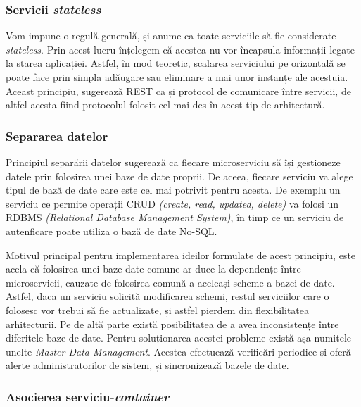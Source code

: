 \subsubsection{Servicii \textit{stateless}}

Vom impune o regulă generală, și anume ca toate serviciile să fie considerate \textit{stateless}. Prin acest lucru înțelegem că acestea nu vor încapsula informații legate la starea aplicației. Astfel, în mod teoretic, scalarea serviciului pe orizontală se poate face prin simpla adăugare sau eliminare a mai unor instanțe ale acestuia. Aceast principiu, sugerează REST ca și protocol de comunicare între servicii, de altfel acesta fiind protocolul folosit cel mai des în acest tip de arhitectură\cite{buildingmicro}. 

\subsubsection{Separarea datelor}

Principiul separării datelor sugerează ca fiecare microserviciu să își gestioneze datele prin folosirea unei baze de date proprii. De aceea, fiecare serviciu va alege tipul de bază de date care este cel mai potrivit pentru acesta. De exemplu un serviciu ce permite operații CRUD \textit{(create, read, updated, delete)} va folosi un RDBMS \textit{(Relational Database Management System)}, în timp ce un serviciu de autenficare poate utiliza o bază de date No-SQL. 

Motivul principal pentru implementarea ideilor formulate de acest principiu, este acela că folosirea unei baze date comune ar duce la dependențe între microservicii, cauzate de folosirea comună a aceleași scheme a bazei de date. Astfel, daca un serviciu solicită modificarea schemi, restul serviciilor care o folosesc vor trebui să fie actualizate, și astfel pierdem din flexibilitatea arhitecturii. Pe de altă parte există posibilitatea de a avea inconsistențe între diferitele baze de date. Pentru soluționarea acestei probleme există așa numitele unelte \textit{Master Data Management}. Acestea efectuează verificări periodice și oferă alerte administratorilor de sistem, și sincronizează bazele de date.

\subsubsection{Asocierea serviciu-\textit{container}}

